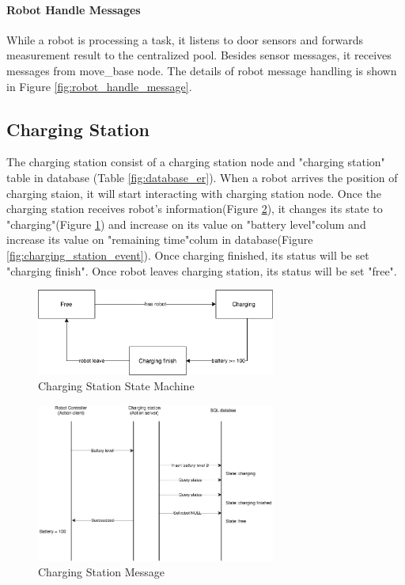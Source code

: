 \paragraph{Robot Handle Messages}
While a robot is processing a task, it listens to door sensors and forwards measurement result to the centralized pool. 
Besides sensor messages, it receives messages from move\_base node. The details of robot message handling is shown in Figure \ref{fig:robot_handle_message}.

\subsection{Charging Station}
\label{sec:charging_station}
The charging station consist of a charging station node and "charging station" table in database (Table \ref{fig:database_er}). 
When a robot arrives the position of charging staion, it will start interacting with charging station node. Once the charging station receives robot's information(Figure \ref{fig:charging_station_message}), it changes its state to "charging"(Figure \ref{fig:charging_station_state_machine}) and increase on its value on "battery level"colum and increase its value on "remaining time"colum in database(Figure \ref{fig:charging_station_event}).  Once charging finished, its status will be set "charging finish". Once robot leaves charging station, its status will be set "free". 


\begin{figure}[htbp]
    \centering
    \includegraphics[width = 0.7\textwidth]{content/images/ch4/charging_station_state_machine.drawio.png}
    \caption{Charging Station State Machine}
    \label{fig:charging_station_state_machine}
\end{figure}

\begin{figure}[htbp]
    \centering
    \includegraphics[width = 0.7\textwidth]{content/images/ch4/charging_station_message.drawio.png}
    \caption{Charging Station Message}
    \label{fig:charging_station_message}
\end{figure}

